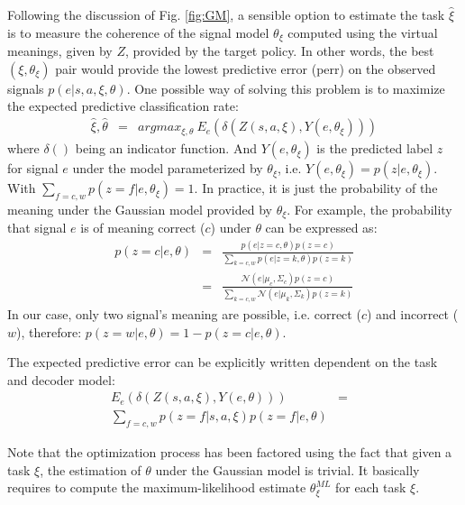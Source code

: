 \documentclass[conference]{IEEEtran}
\begin{document}
Following the discussion of Fig. \ref{fig:GM}, a sensible option to estimate the task $\hat{\xi}$ is to measure the coherence of the signal model $\theta_\xi$ computed using the virtual meanings, given by $Z$, provided by the target policy. In other words, the best $(\xi,\theta_{\xi})$ pair would provide the lowest predictive error (perr) on the observed signals $p(e|s,a,\xi,\theta)$. One possible way of solving this problem is to maximize the expected predictive classification rate:
%
\begin{eqnarray}
\hat{\xi},\hat{\theta}&=& argmax_{\xi,\theta}~E_e\left( \delta(Z(s,a,\xi), Y(e,\theta_\xi)) \right)
\end{eqnarray}
where $\delta()$ being an indicator function. And $Y(e, \theta_\xi)$ is the predicted label $z$ for signal $e$ under the model parameterized by $\theta_\xi$, i.e. $Y(e, \theta_\xi) = p(z|e, \theta_\xi)$. With $\sum_{f=c,w} p(z=f|e, \theta_\xi)=1$.  In practice, it is just the probability of the meaning under the Gaussian model provided by $\theta_{\xi}$. For example, the probability that signal $e$ is of meaning correct ($c$) under $\theta$ can be expressed as:
%
\begin{eqnarray}
	p(z=c|e,\theta) &=& \frac{p(e|z=c, \theta)p(z = c)}{\sum_{k=c,w}{p(e|z=k,\theta)p(z=k)}}\nonumber\\
			&=& \frac{\mathcal{N}(e|\mu_c, \Sigma_c)p(z = c)}{\sum_{k=c,w}{\mathcal{N}(e|\mu_k, \Sigma_k)p(z=k)}}
	\label{eq:dev}
\end{eqnarray}
In our case, only two signal's meaning are possible, i.e. correct ($c$) and incorrect ($w$), therefore: $p(z=w|e,\theta) = 1-p(z=c|e,\theta)$.

The expected predictive error can be explicitly written dependent on the task and decoder model:
%
\begin{eqnarray}
E_e\left( \delta(Z(s,a,\xi), Y(e,\theta)) \right)  &=&  \nonumber \\ \sum_{f=c,w} p(z=f|s,a,\xi) p(z=f|e,\theta)
\end{eqnarray}

Note that the optimization process has been factored using the fact that given a task $\xi$, the estimation of $\theta$ under the Gaussian model is trivial. It basically requires to compute the maximum-likelihood estimate $\theta^{ML}_{\xi}$ for each task $\xi$. 
\end{document}
